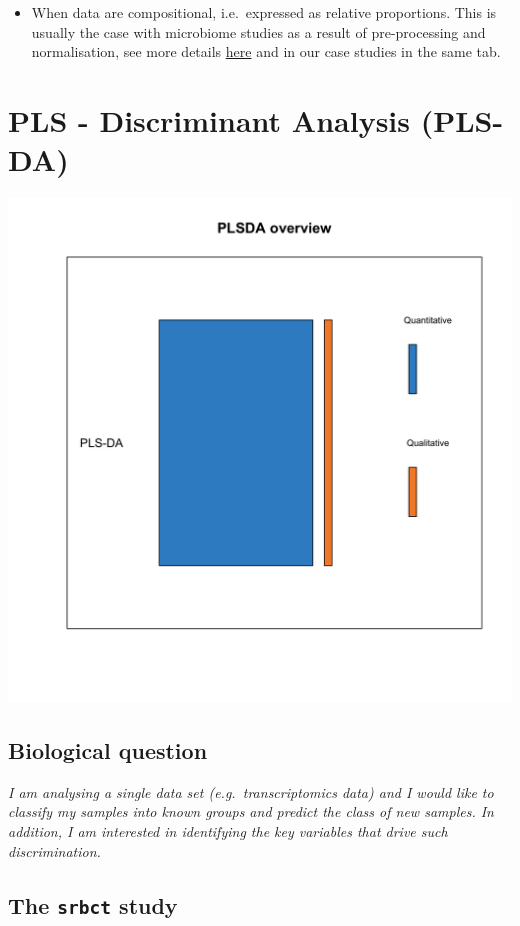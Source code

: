 \documentclass[]{book}
\providecommand{\tightlist}{%
  \setlength{\itemsep}{0pt}\setlength{\parskip}{0pt}}
\begin{document}
\begin{itemize}
  \begin{itemize}
  \tightlist
  \item
    When data are compositional, i.e.~expressed as relative proportions. This is usually the case with microbiome studies as a result of pre-processing and normalisation, see more details \href{http://mixomics.org/mixmc/}{here} and in our case studies in the same tab.
  \end{itemize}
\end{itemize}

\hypertarget{plsda}{%
\chapter{PLS - Discriminant Analysis (PLS-DA)}\label{plsda}}

\begin{center}\includegraphics[width=0.75\linewidth,]{Figures/04-overview-PLSDA-1} \end{center}

\hypertarget{biological-question-2}{%
\section{Biological question}\label{biological-question-2}}

{
\emph{I am analysing a single data set (e.g.~transcriptomics data) and I would like to classify my samples into known groups and predict the class of new samples. In addition, I am interested in identifying the key variables that drive such discrimination.}
}

\hypertarget{the-srbct-study}{%
\section{\texorpdfstring{The \texttt{srbct} study}{The srbct study}}\label{the-srbct-study}}
\end{document}
